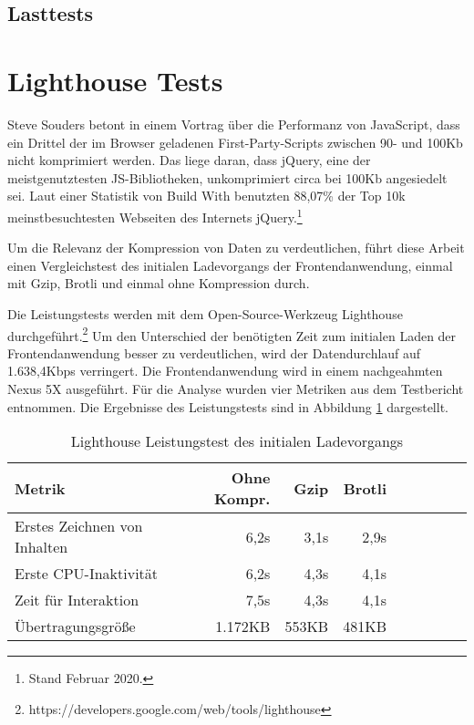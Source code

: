\subsection{Lasttests}
\label{subsec:lasttests}


\section{Lighthouse Tests}
\label{sec:lighthousetests}

Steve Souders betont
in einem Vortrag über die Performanz von JavaScript, dass ein Drittel der im Browser
geladenen First-Party-Scripts zwischen 90- und 100Kb nicht komprimiert werden.
Das liege daran, dass jQuery, eine der meistgenutztesten JS-Bibliotheken,
unkomprimiert circa bei 100Kb angesiedelt sei.\cite{SteveSoudersMakeJavaScriptFaster}
Laut einer Statistik von Build With benutzten 88,07\% der Top 10k meinstbesuchtesten
Webseiten des Internets jQuery.\footnote{Stand Februar 2020.\cite{BuildWithjQuery}}

Um die Relevanz der Kompression von Daten zu verdeutlichen, führt diese Arbeit einen
Vergleichstest des initialen Ladevorgangs der Frontendanwendung,
einmal mit Gzip, Brotli und einmal ohne Kompression durch.

Die Leistungstests
werden mit dem Open-Source-Werkzeug Lighthouse durchgeführt.\footnote{https://developers.google.com/web/tools/lighthouse}
Um den Unterschied der benötigten Zeit zum initialen Laden der Frontendanwendung
besser zu verdeutlichen, wird der Datendurchlauf auf 1.638,4Kbps verringert.
Die Frontendanwendung wird in einem nachgeahmten Nexus 5X ausgeführt.
Für die Analyse wurden vier Metriken aus dem Testbericht entnommen.
Die Ergebnisse des Leistungstests sind in Abbildung \ref{tab:lighthouseleistungstestdesinitialenladevorgangs}
dargestellt.

\begin{table}[h]
\begin{center}
\begin{tabular}{l*{8}{r}}
Metrik & Ohne Kompr. & Gzip & Brotli \\
\hline
Erstes Zeichnen von Inhalten & 6,2s  & 3,1s & 2,9s \\
Erste CPU-Inaktivität        & 6,2s  & 4,3s & 4,1s \\
Zeit für Interaktion         & 7,5s  & 4,3s & 4,1s \\
Übertragungsgröße            & 1.172KB  &  553KB & 481KB \\
\end{tabular}
\end{center}
\caption{Lighthouse Leistungstest des initialen Ladevorgangs}
\label{tab:lighthouseleistungstestdesinitialenladevorgangs}
\end{table}

